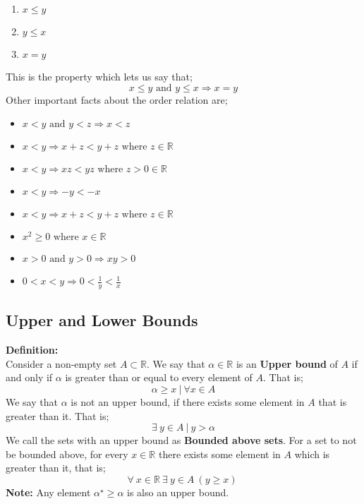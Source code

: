 \documentclass[english,course]{lecture}
\begin{document}
\begin{enumerate}[label=\roman*)]
\item $x \leq y$
\item $y \leq x$
\item $x = y$
\end{enumerate}
This is the property which lets us say that;
$$ x \leq y \text{ and } y \leq x \Rightarrow x=y$$
Other important facts about the order relation are;
\begin{itemize}
\item $ x < y \text{ and } y<z \Rightarrow x<z$
\item $x<y \Rightarrow x+z < y+z \text{ where } z \in \mathbb{R}$
\item $x<y \Rightarrow xz < yz \text{ where } z > 0 \in \mathbb{R} $
\item $x<y \Rightarrow -y < -x $
\item $x<y \Rightarrow x+z < y+z \text{ where } z \in \mathbb{R}$
\item $x^{2} \geq 0 \text{ where } x \in \mathbb{R}$
\item $ x > 0 \text{ and } y > 0 \Rightarrow xy > 0$
\item $ 0 < x <y  \Rightarrow 0 < \frac{1}{y} < \frac{1}{x}$
\end{itemize}

\subsection{Upper and Lower Bounds}
\textbf{Definition:} \\
Consider a non-empty set $A \subset \mathbb{R}$. We say that $\alpha \in \mathbb{R}$ is an \textbf{Upper bound} of $A$ if and only if $\alpha$ is greater than or equal to every element of $A$. That is;
$$ \alpha \geq x \ | \ \forall x \in A $$
We say that $\alpha$ is not an upper bound, if there exists some element in $A$ that is greater than it. That is;
$$ \exists \ y \in A \ | \ y > \alpha $$
We call the sets with an upper bound as \textbf{Bounded above sets}. For a set to not be bounded above, for every $x \in \mathbb{R}$ there exists some element in $A$ which is greater than it, that is;
$$ \forall \ x \in \mathbb{R} \ \exists \ y \in A \ (y \geq x) \ $$
\textbf{Note:}
Any element $\alpha^{\star} \geq \alpha$ is also an upper bound.
\end{document}
